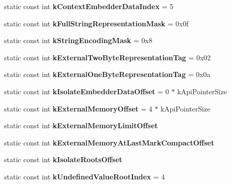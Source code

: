 \begin{DoxyCompactItemize}
\item 
\mbox{\label{classv8_1_1internal_1_1Internals_afb65846499ec5f68172e4b2e8301a493}} 
static const int {\bfseries k\+Context\+Embedder\+Data\+Index} = 5
\item 
\mbox{\label{classv8_1_1internal_1_1Internals_a5c39a86b30463928ea719def66916507}} 
static const int {\bfseries k\+Full\+String\+Representation\+Mask} = 0x0f
\item 
\mbox{\label{classv8_1_1internal_1_1Internals_a1927ac3def13a57e03025e62ca46d1c5}} 
static const int {\bfseries k\+String\+Encoding\+Mask} = 0x8
\item 
\mbox{\label{classv8_1_1internal_1_1Internals_a73faf917416d2519b65c7255e77a74ce}} 
static const int {\bfseries k\+External\+Two\+Byte\+Representation\+Tag} = 0x02
\item 
\mbox{\label{classv8_1_1internal_1_1Internals_ac789a0a139ccbacec0c5fb2d79427305}} 
static const int {\bfseries k\+External\+One\+Byte\+Representation\+Tag} = 0x0a
\item 
\mbox{\label{classv8_1_1internal_1_1Internals_ad722bf4760df09958cd1062db4a5524c}} 
static const int {\bfseries k\+Isolate\+Embedder\+Data\+Offset} = 0 $\ast$ k\+Api\+Pointer\+Size
\item 
\mbox{\label{classv8_1_1internal_1_1Internals_a29ea1efa730a5108018424287556faa1}} 
static const int {\bfseries k\+External\+Memory\+Offset} = 4 $\ast$ k\+Api\+Pointer\+Size
\item 
static const int {\bfseries k\+External\+Memory\+Limit\+Offset}
\item 
static const int {\bfseries k\+External\+Memory\+At\+Last\+Mark\+Compact\+Offset}
\item 
static const int {\bfseries k\+Isolate\+Roots\+Offset}
\item 
\mbox{\label{classv8_1_1internal_1_1Internals_a7281ff0eafed559e64613465b1a03296}} 
static const int {\bfseries k\+Undefined\+Value\+Root\+Index} = 4

\end{DoxyCompactItemize}

